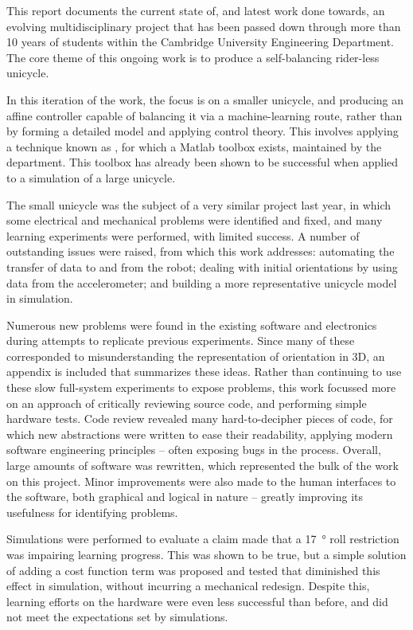 \documentclass[main.tex]{subfiles}
\begin{document}
This report documents the current state of, and latest work done towards, an evolving multidisciplinary project that has been passed down through more than 10 years of students within the Cambridge University Engineering Department. The core theme of this ongoing work is to produce a self-balancing rider-less unicycle.

In this iteration of the work, the focus is on a smaller unicycle, and producing an affine controller capable of balancing it via a machine-learning route, rather than by forming a detailed model and applying control theory. This involves applying a technique known as {\Pilco}, for which a Matlab toolbox exists, maintained by the department. This toolbox has already been shown to be successful when applied to a simulation of a large unicycle.

The small unicycle was the subject of a very similar project last year, in which some electrical and mechanical problems were identified and fixed, and many learning experiments were performed, with limited success.
A number of outstanding issues were raised, from which this work addresses:
automating the transfer of data to and from the robot;
dealing with initial orientations by using data from the accelerometer;
and building a more representative unicycle model in simulation.

Numerous new problems were found in the existing software and electronics during attempts to replicate previous experiments.
Since many of these corresponded to misunderstanding the representation of orientation in 3D, an appendix is included that summarizes these ideas.
Rather than continuing to use these slow full-system experiments to expose problems, this work focussed more on an approach of critically reviewing source code, and performing simple hardware tests.
Code review revealed many hard-to-decipher pieces of code, for which new abstractions were written to ease their readability, applying modern software engineering principles -- often exposing bugs in the process.
Overall, large amounts of software was rewritten, which represented the bulk of the work on this project.
Minor improvements were also made to the human interfaces to the software, both graphical and logical in nature -- greatly improving its usefulness for identifying problems.

Simulations were performed to evaluate a claim made that a \SI{17}{\degree} roll restriction was impairing learning progress. This was shown to be true, but a simple solution of adding a cost function term was proposed and tested that diminished this effect in simulation, without incurring a mechanical redesign.
Despite this, learning efforts on the hardware were even less successful than before, and did not meet the expectations set by simulations.
\end{document}

